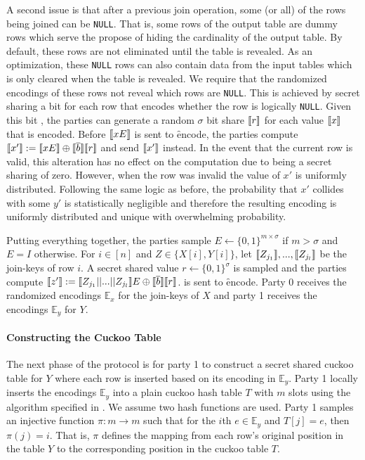 A second issue is that after a previous join operation, some (or all) of the rows being joined can be \texttt{NULL}. That is, some rows of the output table are dummy rows which serve the propose of hiding the cardinality of the output table. By default, these rows are not eliminated until the table is revealed. As an optimization, these \texttt{NULL} rows can also contain data from the input tables which is only cleared when the table is revealed. We require that the randomized encodings of these rows not reveal which rows are \texttt{NULL}. This is achieved by secret sharing a bit for each row that encodes whether the row is logically \texttt{NULL}. Given this bit , the parties can generate a random $\sigma$ bit share $\llbracket r\rrbracket$ for each value $\llbracket x\rrbracket$ that is encoded. Before $\llbracket xE\rrbracket$ is sent to \f{encode}, the parties compute $\llbracket x'\rrbracket:=\llbracket xE\rrbracket\oplus \llbracket \overline{b}\rrbracket\llbracket r\rrbracket$ and send $\llbracket x'\rrbracket$ instead.
\iffullversion
 In the event that the current row is valid, this alteration has no effect on the computation due to  being a secret sharing of zero. However, when the row was invalid the value of $x'$ is uniformly distributed. 
\fi
 Following the same logic as before, the probability that $x'$ collides with some $y'$ is statistically negligible and therefore the resulting encoding is uniformly distributed and unique with overwhelming probability. 


Putting everything together, the parties sample $E\gets\{0,1\}^{m\times \sigma}$ if $m>\sigma$ and $E=I$ otherwise. For $i\in[n]$ and $Z\in\{X[i],Y[i]\}$, let  $\llbracket Z_{j_1}\rrbracket,...,\llbracket Z_{j_l}\rrbracket$ be the join-keys of row $i$. A secret shared value $r\gets\{0,1\}^\sigma$ is sampled and the parties compute $\llbracket z'\rrbracket:=\llbracket Z_{j_1}||...||Z_{j_l}\rrbracket E \oplus \llbracket \overline{b}\rrbracket\llbracket r\rrbracket$.  is sent to \f{encode}. Party 0 receives the randomized encodings $\mathbb{E}_x$ for the join-keys of $X$ and party 1 receives the encodings $\mathbb{E}_y$ for $Y$.

\paragraph{Constructing the Cuckoo Table}

The next phase of the protocol is for party 1 to construct a secret shared cuckoo table for $Y$ where each row is inserted based on its encoding in $\mathbb{E}_y$. Party 1 locally inserts the encodings $\mathbb{E}_y$ into a plain cuckoo hash table $T$ with $m$ slots using the algorithm specified in . We assume two hash functions are used. Party 1 samples an injective function $\pi : m\rightarrow m$ such that for the $i$th $e\in \mathbb{E}_y$ and $T[j]=e$, then $\pi(j)=i$.
\iffullversion
 That is, $\pi$ defines the mapping from each row's original position in the table $Y$ to the corresponding position in the cuckoo table $T$.
\fi


